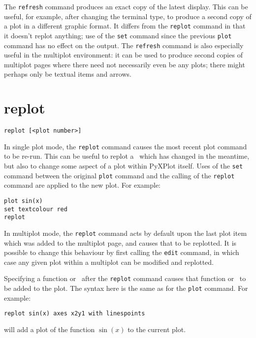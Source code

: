 The {\tt refresh} command produces an exact copy of the latest display. This can
be useful, for example, after changing the terminal type, to produce a second
copy of a plot in a different graphic format. It differs from the {\tt replot}
command in that it doesn't replot anything; use of the {\tt set} command since
the previous {\tt plot} command has no effect on the output. The {\tt refresh}
command is also especially useful in the multiplot environment: it can be used
to produce second copies of multiplot pages where there need not necessarily
even be any plots; there might perhaps only be textual items and arrows.

\section{replot}

\begin{verbatim}
replot [<plot number>]
\end{verbatim}

In single plot mode, the {\tt replot} command causes the most recent plot
command to be re-run.  This can be useful to replot a \datafile\ which has changed
in the meantime, but also to change some aspect of a plot within PyXPlot itself.
Uses of the {\tt set} command between the original {\tt plot} command and the
calling of the {\tt replot} command are applied to the new plot. For example:

\begin{verbatim}
plot sin(x)
set textcolour red
replot
\end{verbatim}

In multiplot mode, the {\tt replot} command acts by default upon the last plot
item which was added to the multiplot page, and causes that to be replotted. It
is possible to change this behaviour by first calling the {\tt edit} command, in
which case any given plot within a multiplot can be modified and replotted.

Specifying a function or \datafile\ after the {\tt replot} command causes that
function or \datafile\ to be added to the plot. The syntax here is the same as
for the {\tt plot} command.  For example:

\begin{verbatim}
replot sin(x) axes x2y1 with linespoints
\end{verbatim}

\noindent will add a plot of the function $\sin(x)$ to the current plot.

